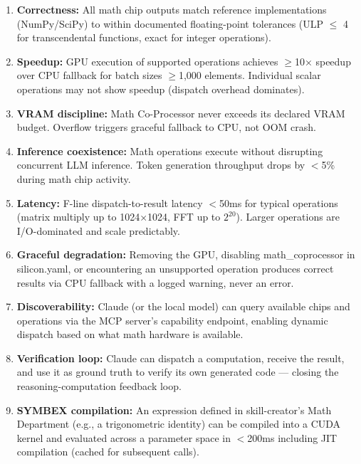 \documentclass[11pt,letterpaper]{article}
\begin{document}
\begin{enumerate}[leftmargin=2em]
\item \textbf{Correctness:} All math chip outputs match reference implementations (NumPy/SciPy) to within documented floating-point tolerances (ULP $\leq$ 4 for transcendental functions, exact for integer operations).

\item \textbf{Speedup:} GPU execution of supported operations achieves $\geq$10× speedup over CPU fallback for batch sizes $\geq$1,000 elements. Individual scalar operations may not show speedup (dispatch overhead dominates).

\item \textbf{VRAM discipline:} Math Co-Processor never exceeds its declared VRAM budget. Overflow triggers graceful fallback to CPU, not OOM crash.

\item \textbf{Inference coexistence:} Math operations execute without disrupting concurrent LLM inference. Token generation throughput drops by $<$5\% during math chip activity.

\item \textbf{Latency:} F-line dispatch-to-result latency $<$50ms for typical operations (matrix multiply up to 1024×1024, FFT up to $2^{20}$). Larger operations are I/O-dominated and scale predictably.

\item \textbf{Graceful degradation:} Removing the GPU, disabling math\_coprocessor in silicon.yaml, or encountering an unsupported operation produces correct results via CPU fallback with a logged warning, never an error.

\item \textbf{Discoverability:} Claude (or the local model) can query available chips and operations via the MCP server's capability endpoint, enabling dynamic dispatch based on what math hardware is available.

\item \textbf{Verification loop:} Claude can dispatch a computation, receive the result, and use it as ground truth to verify its own generated code --- closing the reasoning-computation feedback loop.

\item \textbf{SYMBEX compilation:} An expression defined in skill-creator's Math Department (e.g., a trigonometric identity) can be compiled into a CUDA kernel and evaluated across a parameter space in $<$200ms including JIT compilation (cached for subsequent calls).


\end{enumerate}
\end{document}
